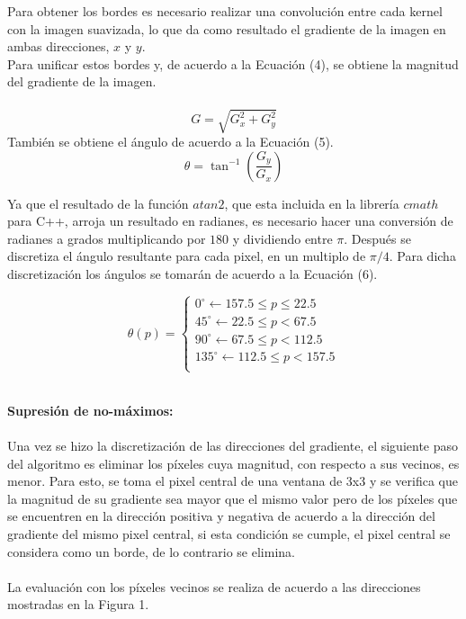 \documentclass[conference]{IEEEtran}
\begin{document}
Para obtener los bordes es necesario realizar una convoluci\'on entre cada kernel con la imagen suavizada, lo que da como resultado el gradiente de la imagen en ambas direcciones, $x$ y $y$.\\
Para unificar estos bordes y, de acuerdo a la Ecuaci\'on (4), se obtiene la magnitud del gradiente de la imagen.\\\\
\begin{equation}
	G = \sqrt{G_{x}^2 + G_{y}^2}
\end{equation}
Tambi\'en se obtiene el \'angulo de acuerdo a la Ecuaci\'on (5).
\begin{equation}
	\theta =  \tan^{-1}\left(\frac{G_y}{G_x}\right)
\end{equation}

Ya que el resultado de la funci\'on $atan2$, que esta incluida en la librer\'ia $cmath$ para C++, arroja un resultado en radianes, es necesario hacer una conversi\'on de radianes a grados multiplicando por $180$ y dividiendo entre $\pi$. Despu\'es se discretiza el \'angulo resultante para cada pixel, en un multiplo de $\pi /4$. Para dicha discretizaci\'on los \'angulos se tomar\'an de acuerdo a la Ecuaci\'on (6).

\begin{equation}
    \theta(p) = \left\{
       \begin{array}{ll}
	 0^{\circ} \leftarrow 157.5 \leq p \leq 22.5   \\
	45^{\circ} \leftarrow 22.5 \leq p < 67.5 \\
	90^{\circ} \leftarrow 67.5 \leq p < 112.5 \\
   135^{\circ} \leftarrow 112.5 \leq p < 157.5 \\
       \end{array}
    \right.
\end{equation}

\textbf{\\ Supresi\'on de no-m\'aximos:\\\\}
Una vez se hizo la discretizaci\'on de las direcciones del gradiente, el siguiente paso del algoritmo es eliminar los p\'ixeles cuya magnitud, con respecto a sus vecinos, es menor. Para esto, se toma el pixel central de una ventana de 3x3 y se verifica que la magnitud de su gradiente sea mayor que el mismo valor pero de los p\'ixeles que se encuentren en la direcci\'on positiva y negativa de acuerdo a la direcci\'on del gradiente del mismo pixel central, si esta condici\'on se cumple, el pixel central se considera como un borde, de lo contrario se elimina.\\\\
La evaluaci\'on con los p\'ixeles vecinos se realiza de acuerdo a las direcciones mostradas en la Figura 1.
\end{document}
